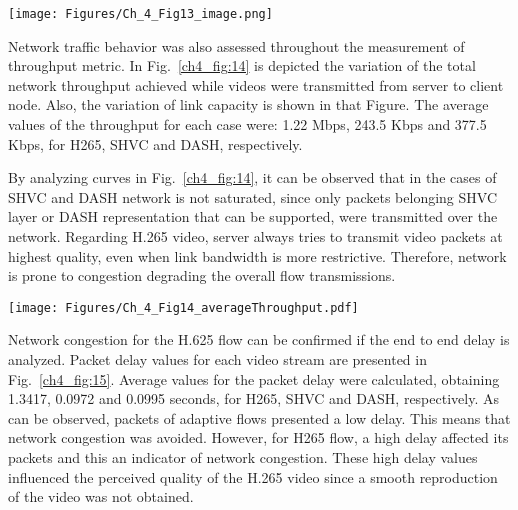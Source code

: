 \begin{center}
\texttt{[image: Figures/Ch\_4\_Fig13\_image.png]}
\label{ch4_fig:13}       %
\end{center}


Network traffic behavior was also assessed throughout the measurement of throughput metric. In Fig.~\ref{ch4_fig:14} is depicted the variation of the total network throughput achieved while videos were transmitted from server to client node. Also, the variation of link capacity is shown in that Figure. The average values of the throughput for each case were: 1.22 Mbps, 243.5 Kbps and 377.5 Kbps, for H265, SHVC and DASH, respectively.

By analyzing curves in Fig.~\ref{ch4_fig:14}, it can be observed that in the cases of SHVC and DASH network is not saturated, since only packets belonging SHVC layer or DASH representation that can be supported, were transmitted over the network. Regarding H.265 video, server always tries to transmit video packets at highest quality, even when link bandwidth is more restrictive. Therefore, network is prone to congestion degrading the overall flow transmissions.

\begin{center}
\texttt{[image: Figures/Ch\_4\_Fig14\_averageThroughput.pdf]}
\label{ch4_fig:14}       %
\end{center}


Network congestion for the H.625 flow can be confirmed if the end to end delay is analyzed. Packet delay values for each video stream are presented in Fig.~\ref{ch4_fig:15}. Average values for the packet delay were calculated, obtaining 1.3417, 0.0972 and 0.0995 seconds, for H265, SHVC and DASH, respectively. As can be observed, packets of adaptive flows presented a low delay. This means that network congestion was avoided. However, for H265 flow, a high delay affected its packets and this an indicator of network congestion. These high delay values influenced the perceived quality of the H.265 video since a smooth reproduction of the video was not obtained.

